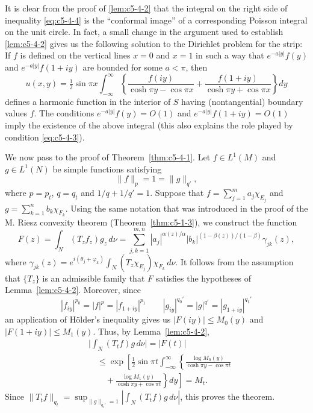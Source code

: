 It is clear from the proof of \eqref{lem:c5-4-2} that the integral on the right
side of inequality \eqref{eq:c5-4-4} is the ``conformal image'' of a
corresponding Poisson integral on the unit circle. In fact, a small change in
the argument used to establish \eqref{lem:c5-4-2} gives us the following
solution to the Dirichlet problem for the strip: If $f$ is defined on the
vertical lines $x = 0$ and $x = 1$ in such a way that $e^{-a|y|}f(y)$ and
$e^{-a|y|}f(1 + iy)$ are bounded for some $a < \pi$, then
\[
u(x,y)=\tfrac{1}{2}\sin\pi x\int_{-\infty}^{\infty}
\left\{\frac{f(iy)}{\cosh\pi y-\cos\pi x}
+\frac{f(1+iy)}{\cosh\pi y+\cos\pi x}\right\}dy
\]
defines a harmonic function in the interior of $S$ having (nontangential)
boundary values $f$. The conditions $e^{-a|y|}f(y) = O(1)$ and
$e^{-a|y|}f(1 + iy) = O(1)$ imply the existence of the above integral (this
also explains the role played by condition \eqref{eq:c5-4-3}).

We now pass to the proof of Theorem~\ref{thm:c5-4-1}. Let $f \in L^{1}(M)$ and
$g \in L^{1}(N)$ be simple functions satisfying
\[
\|f\|_{p}=1=\|g\|_{q'},
\]
where $p = p_{t}$, $q = q_{t}$ and $1/q + 1/q' = 1$. Suppose that
$f = \sum_{j=1}^{m}a_{j}\chi_{E_{j}}$ and
$g = \sum_{k=1}^{n}b_{k}\chi_{F_{k}}$. Using the same notation that was
introduced in the proof of the M. Riesz convexity theorem
(Theorem~\ref{thm:c5-1-3}), we construct the function
\[
F(z)=\int_{N}(T_{z}f_{z})g_{z}\,d\nu
=\sum_{j,k=1}^{m,n}|a_{j}|^{\alpha(z)/\alpha}|b_{k}|^{(1-\beta(z))/(1-\beta)}\gamma_{jk}(z),
\]
where
$\gamma_{jk}(z) = e^{i(\theta_{j} + \varphi_{k})}\int_{N}(T_{z}\chi_{E_{j}})\chi_{F_{k}}\,d\nu$.
It follows from the assumption that $\{T_{z}\}$ is an admissible family that
$F$ satisfies the hypotheses of Lemma~\ref{lem:c5-4-2}. Moreover, since
\[
|f_{iy}|^{p_{0}}=|f|^{p}=|f_{1+iy}|^{p_{1}}
\qquad
|g_{iy}|^{q_{0}'}=|g|^{q'}=|g_{1+iy}|^{q_{1}'}
\]
an application of H\"older's inequality gives us $|F(iy)| \leq M_{0}(y)$ and
$|F(1 + iy)| \leq M_{1}(y)$. Thus, by Lemma~\ref{lem:c5-4-2},
\begin{align*}
&\bigg|\int_{N}(T_{t}f)g\,d\nu\bigg|=|F(t)|\\
&\quad\leq\exp\left[\tfrac{1}{2}\sin\pi t\int_{-\infty}^{\infty}
\left\{\frac{\log M_{0}(y)}{\cosh\pi y-\cos\pi t}\right.\right.\\
&\quad\quad\left.\left.{}+\frac{\log M_{1}(y)}{\cosh\pi y+\cos\pi t}\right\}dy\right]=M_{t}.
\end{align*}
Since
$\|T_{t}f\|_{q_{t}} = \sup_{\|g\|_{q_{t}'} = 1}|\int_{N}(T_{t}f)g\,d\nu|$,
this proves the theorem.

